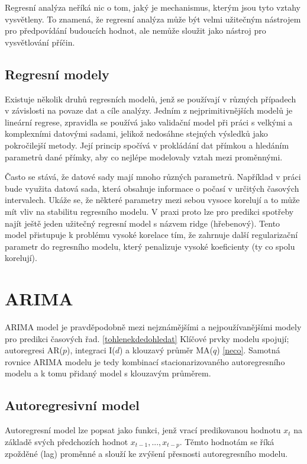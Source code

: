 \documentclass[FM,BP,fonts]{tulthesis}
\begin{document}
Regresní analýza neříká nic o tom, jaký je mechanismus, kterým jsou tyto vztahy vysvětleny. To znamená, že regresní analýza může být velmi užitečným nástrojem pro předpovídání budoucích hodnot, ale nemůže sloužit jako nástroj pro vysvětlování příčin.

\subsection{Regresní modely}
Existuje několik druhů regresních modelů, jenž se používají v různých případech v závislosti na povaze dat a cíle analýzy. Jedním z nejprimitivnějších modelů je lineární regrese, zpravidla se používá jako validační model při práci s velkými a komplexními datovými sadami, jelikož nedosáhne stejných výsledků jako pokročilejší metody. Její princip spočívá v prokládání dat přímkou a hledáním parametrů dané přímky, aby co nejlépe modelovaly vztah mezi proměnnými.

Často se stává, že datové sady mají mnoho různých parametrů. Například v práci bude využita datová sada, která obsahuje informace o počasí v určitých časových intervalech. Ukáže se, že některé parametry mezi sebou vysoce korelují a to může mít vliv na stabilitu regresního modelu. V praxi proto lze pro predikci spotřeby najít ještě jeden užitečný regresní model s názvem ridge (hřebenový). Tento model přistupuje k problému vysoké korelace tím, že zahrnuje další regularizační parametr do regresního modelu, který penalizuje vysoké koeficienty (ty co spolu korelují).

\section{ARIMA}
ARIMA model je pravděpodobně mezi nejznámějšími a nejpoužívanějšími modely pro predikci časových řad. \ref{tohlenekdedohledat} Klíčové prvky modelu spojují;	 autoregresi AR($p$), integraci I($d$) a klouzavý průměr MA($q$) \ref{neco}. Samotná rovnice ARIMA modelu je tedy kombinací stacionarizovaného autoregresního modelu a k tomu přidaný model s klouzavým průměrem.
\subsection{Autoregresivní model}
Autoregresní model lze popsat jako funkci, jenž vrací predikovanou hodnotu $x_t$ na základě svých předchozích hodnot $x_{t-1}, ...,  x_{t-p}$. Těmto hodnotám se říká zpožděné (lag) proměnné a slouží ke zvýšení přesnosti autoregresního modelu. 
\end{document}
